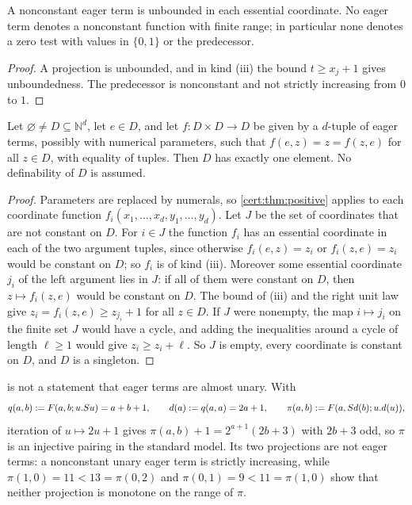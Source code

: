 \begin{corollary}\label{cert:cor:positive}
A nonconstant eager term is unbounded in each essential coordinate. No eager
term denotes a nonconstant function with finite range; in particular none
denotes a zero test with values in $\{0,1\}$ or the predecessor.
\end{corollary}
\begin{proof}
A projection is unbounded, and in kind (iii) the bound $t\ge x_j+1$ gives
unboundedness. The predecessor is nonconstant and not strictly increasing
from $0$ to $1$.
\end{proof}

\begin{theorem}\label{cert:thm:unit}
Let $\varnothing\neq D\subseteq\mathbb N^{d}$, let $e\in D$, and let
$f\colon D\times D\to D$ be given by a $d$-tuple of eager terms, possibly with
numerical parameters, such that $f(e,z)=z=f(z,e)$ for all $z\in D$, with
equality of tuples. Then $D$ has exactly one element. No definability of $D$
is assumed.
\end{theorem}
\begin{proof}
Parameters are replaced by numerals, so \cref{cert:thm:positive} applies to
each coordinate function $f_i(x_1,\dots,x_d,y_1,\dots,y_d)$. Let $J$ be the
set of coordinates that are not constant on $D$. For $i\in J$ the function
$f_i$ has an essential coordinate in each of the two argument tuples, since
otherwise $f_i(e,z)=z_i$ or $f_i(z,e)=z_i$ would be constant on $D$; so $f_i$
is of kind (iii). Moreover some essential coordinate $j_i$ of the left
argument lies in $J$: if all of them were constant on $D$, then
$z\mapsto f_i(z,e)$ would be constant on $D$. The bound of (iii) and the right
unit law give $z_i=f_i(z,e)\ge z_{j_i}+1$ for all $z\in D$. If $J$ were
nonempty, the map $i\mapsto j_i$ on the finite set $J$ would have a cycle,
and adding the inequalities around a cycle of length $\ell\ge 1$ would give
$z_i\ge z_i+\ell$. So $J$ is empty, every coordinate is constant on $D$, and
$D$ is a singleton.
\end{proof}

 is not a statement that eager terms are almost unary.
With
\[
q(a,b)\mathrel{:=} F(a,b;u.S u)=a+b+1,\qquad d(a)\mathrel{:=} q(a,a)=2a+1,\qquad
\pi(a,b)\mathrel{:=} F(a,S d(b);u.d(u)),
\]
iteration of $u\mapsto 2u+1$ gives $\pi(a,b)+1=2^{a+1}(2b+3)$ with $2b+3$
odd, so $\pi$ is an injective pairing in the standard model. Its two
projections are not eager terms: a nonconstant unary eager term is strictly
increasing, while $\pi(1,0)=11<13=\pi(0,2)$ and $\pi(0,1)=9<11=\pi(1,0)$ show
that neither projection is monotone on the range of $\pi$.

